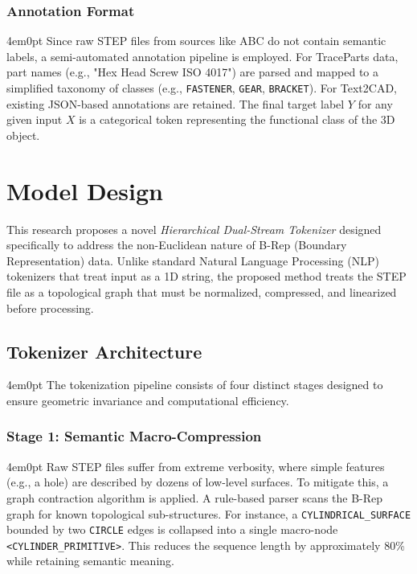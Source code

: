 	\subsubsection{Annotation Format}
	\begin{indentedblock}{4em}{0pt}
		Since raw STEP files from sources like ABC do not contain semantic labels, a semi-automated annotation pipeline is employed. For TraceParts data, part names (e.g., "Hex Head Screw ISO 4017") are parsed and mapped to a simplified taxonomy of classes (e.g., \texttt{FASTENER}, \texttt{GEAR}, \texttt{BRACKET}). For Text2CAD, existing JSON-based annotations are retained. The final target label $Y$ for any given input $X$ is a categorical token representing the functional class of the 3D object.
	\end{indentedblock}

\section{Model Design}
\label{sec:model_design}

This research proposes a novel \textit{Hierarchical Dual-Stream Tokenizer} designed specifically to address the non-Euclidean nature of B-Rep (Boundary Representation) data. Unlike standard Natural Language Processing (NLP) tokenizers that treat input as a 1D string, the proposed method treats the STEP file as a topological graph that must be normalized, compressed, and linearized before processing.

\subsection{Tokenizer Architecture}
	\begin{indentedblock}{4em}{0pt}
		The tokenization pipeline consists of four distinct stages designed to ensure geometric invariance and computational efficiency.
	\end{indentedblock}
	\subsubsection{Stage 1: Semantic Macro-Compression}
		\begin{indentedblock}{4em}{0pt}
			Raw STEP files suffer from extreme verbosity, where simple features (e.g., a hole) are described by dozens of low-level surfaces. To mitigate this, a graph contraction algorithm is applied. A rule-based parser scans the B-Rep graph for known topological sub-structures. For instance, a \texttt{CYLINDRICAL\_SURFACE} bounded by two \texttt{CIRCLE} edges is collapsed into a single macro-node \texttt{<CYLINDER\_PRIMITIVE>}. This reduces the sequence length by approximately 80\% while retaining semantic meaning.
		\end{indentedblock}
	
